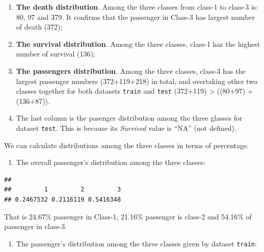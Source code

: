 \documentclass[
]{book}
\newenvironment{Shaded}{\begin{snugshade}}{\end{snugshade}}
\newcommand{\CommentTok}[1]{\textcolor[rgb]{0.56,0.35,0.01}{\textit{#1}}}
\newcommand{\KeywordTok}[1]{\textcolor[rgb]{0.13,0.29,0.53}{\textbf{#1}}}
\newcommand{\NormalTok}[1]{#1}
\newcommand{\OperatorTok}[1]{\textcolor[rgb]{0.81,0.36,0.00}{\textbf{#1}}}
\providecommand{\tightlist}{%
  \setlength{\itemsep}{0pt}\setlength{\parskip}{0pt}}
\begin{document}
\begin{enumerate}
\def\labelenumi{\arabic{enumi}.}
\item
  \textbf{The death distribution}. Among the three classes from class-1 to class-3 is: 80, 97 and 379. It confirms that the passenger in Class-3 has largest number of death (372);
\item
  \textbf{The survival distribution}. Among the three classes, class-1 has the highest number of survival (136);
\item
  \textbf{The passengers distribution}. Among the three classes, class-3 has the largest passenger numbers (372+119+218) in total, and overtaking other two classes together for both datasets \texttt{train} and \texttt{test} (372+119) \textgreater{} ((80+97) + (136+87)).
\item
  The last column is the pasenger distribution among the three glasses for dataset \texttt{test}. This is because its \emph{Survived} value is ``NA'' (not defined).
\end{enumerate}

We can calculate distributions among the three classes in terms of percentage.

\begin{enumerate}
\def\labelenumi{\arabic{enumi}.}
\tightlist
\item
  The overall passenger's distribution among the three classes:
\end{enumerate}

\begin{Shaded}
\end{Shaded}

\begin{verbatim}
## 
##         1         2         3 
## 0.2467532 0.2116119 0.5416348
\end{verbatim}

That is 24.67\% passenger in Class-1, 21.16\% passenger is class-2 and 54.16\% of passenger in class-3.

\begin{enumerate}
\def\labelenumi{\arabic{enumi}.}
\setcounter{enumi}{1}
\tightlist
\item
  The passenger's distribution among the three classes given by dataset \texttt{train}:
\end{enumerate}
\end{document}
